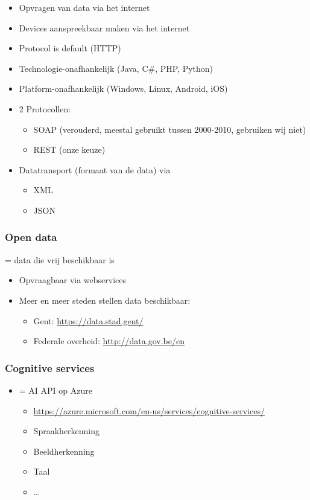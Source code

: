 \documentclass{article}
\begin{document}
\begin{itemize}
    \item Opvragen van data via het internet
    \item Devices aanspreekbaar maken via het internet
    \item Protocol is default (HTTP)
    \item Technologie-onafhankelijk (Java, C\#, PHP, Python)
    \item Platform-onafhankelijk (Windows, Linux, Android, iOS)
    \item 2 Protocollen:
    \begin{itemize}
        \item SOAP (verouderd, meestal gebruikt tussen 2000-2010, gebruiken wij niet)
        \item REST (onze keuze)
    \end{itemize}
    \item Datatransport (formaat van de data) via
    \begin{itemize}
        \item XML
        \item JSON
    \end{itemize}
\end{itemize}

\subsubsection{Open data}
= data die vrij beschikbaar is

\begin{itemize}
    \item Opvraagbaar via webservices
    \item Meer en meer steden stellen data beschikbaar:
    \begin{itemize}
        \item Gent: \url{https://data.stad.gent/}
        \item Federale overheid: \url{http://data.gov.be/en}
    \end{itemize}
\end{itemize}

\subsubsection{Cognitive services}
\begin{itemize}
    \item = AI API op Azure
    \begin{itemize}
        \item \url{https://azure.microsoft.com/en-us/services/cognitive-services/}
        \item Spraakherkenning
        \item Beeldherkenning
        \item Taal
        \item \dots
    \end{itemize}
\end{itemize}
\end{document}
